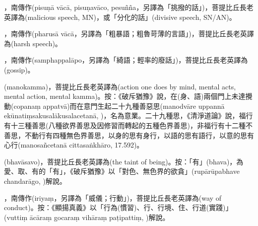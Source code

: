\startitemgroup[noteitems]
\item{}，南傳作(pisuṇā vācā, pisuṇavāco, pesuñña，另譯為「挑撥的話」)，菩提比丘長老英譯為(malicious speech, MN)，或「分化的話」(divisive speech, SN/AN)。
\stopitemgroup

\startitemgroup[noteitems]
\item{}，南傳作(pharusā vācā，另譯為「粗暴語；粗魯苛薄的言語」)，菩提比丘長老英譯為(harsh speech)。
\stopitemgroup

\startitemgroup[noteitems]
\item{}，南傳作(samphappalāpo，另譯為「綺語；輕率的廢話」)，菩提比丘長老英譯為(gossip)。
\stopitemgroup

\startitemgroup[noteitems]
\item{}(manokamma)，菩提比丘長老英譯為(action one does by mind, mental acts, mental action, mental kamma)。按：《破斥猶豫》說，在(身、語)兩個門上未達攪動(copanaṃ appatvā)而在意門生起二十九種善惡思(manodvāre uppannā ekūnatiṃsakusalākusalacetanā, )，名為意業。二十九種思，《清淨道論》說，福行有十三種善思(八種欲界善思及因修習而轉起的五種色界善思)，非福行有十二種不善思，不動行有四種無色界善思，以身的思有身行，以語的思有語行，以意的思有心行(manosañcetanā cittasaṅkhāro, 17.592)。
\stopitemgroup

\startitemgroup[noteitems]
\item{}(bhavāsavo)，菩提比丘長老英譯為(the taint of being)。按：「有」(bhava)，為愛、取、有的「有」，《破斥猶豫》以「對色、無色界的欲貪」(rupārūpabhave chandarāgo, )解說。
\stopitemgroup

\startitemgroup[noteitems]
\item{}，南傳作(iriyaṃ，另譯為「威儀；行動」)，菩提比丘長老英譯為(way of conduct)。按：《顯揚真義》以「行為(慣習)、行、行境、住、行道(實踐)」(vuttiṃ ācāraṃ gocaraṃ vihāraṃ paṭipattiṃ, )解說。
\stopitemgroup

